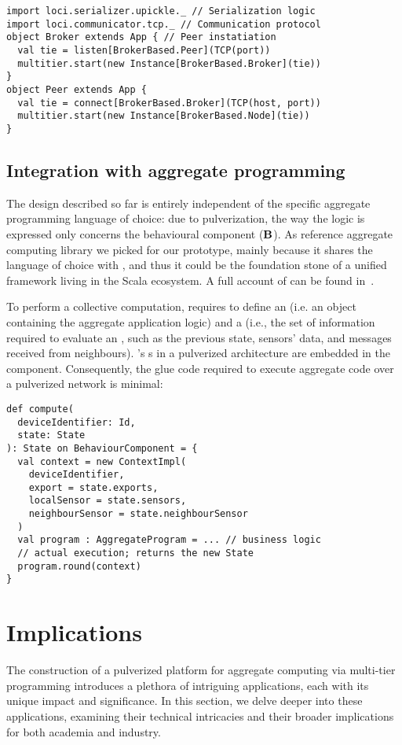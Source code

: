 \begin{lstlisting}
import loci.serializer.upickle._ // Serialization logic
import loci.communicator.tcp._ // Communication protocol
object Broker extends App { // Peer instatiation
  val tie = listen[BrokerBased.Peer](TCP(port))
  multitier.start(new Instance[BrokerBased.Broker](tie))
}
object Peer extends App {
  val tie = connect[BrokerBased.Broker](TCP(host, port))
  multitier.start(new Instance[BrokerBased.Node](tie))
}
\end{lstlisting}

\subsection{Integration with aggregate programming}
\label{scafiloci}
The design described so far is entirely independent of the specific aggregate programming language of choice:
 due to pulverization, the way the logic is expressed only concerns the behavioural component ($\mathbf{B}$).
%
As reference aggregate computing library we picked \scafi{} for our prototype,
 mainly because it shares the language of choice with \scalaloci{},
 and thus it could be the foundation stone of a unified framework living in the Scala ecosystem.  
 A full account of \scafi{} can be found in~.

To perform a collective computation, 
 \scafi{} requires to define an  
  (i.e. an object containing the aggregate application logic) and 
 a  (i.e., the set of information required to evaluate an , 
 such as the previous state, sensors' data, and messages received from neighbours).
%
\scafi{}'s s in a pulverized architecture are embedded in the  component.
%
Consequently, the glue code required to execute \scafi{} aggregate code over a pulverized network is minimal:
\begin{lstlisting}
def compute(
  deviceIdentifier: Id,
  state: State
): State on BehaviourComponent = {
  val context = new ContextImpl(
    deviceIdentifier,
    export = state.exports,
    localSensor = state.sensors,
    neighbourSensor = state.neighbourSensor
  )
  val program : AggregateProgram = ... // business logic
  // actual execution; returns the new State
  program.round(context)
}
\end{lstlisting}
\section{Implications}
\label{implicitation}
The construction of a pulverized platform for aggregate computing via multi-tier programming introduces a plethora of intriguing applications, 
 each with its unique impact and significance. 
 In this section, we delve deeper into these applications, 
 examining their technical intricacies and their broader implications for both academia and industry.

